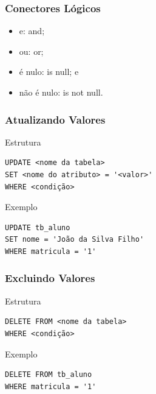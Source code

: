 \documentclass{beamer}
\begin{document}
\begin{frame}
\frametitle{Conectores Lógicos}

\begin{itemize}
	\item e: and;
	\item ou: or;
	\item é nulo: is null; e
	\item não é nulo: is not null.
\end{itemize}
\end{frame}

\begin{frame}[fragile]
\frametitle{Atualizando Valores}

\begin{block}{Estrutura}
\begin{lstlisting}
UPDATE <nome da tabela>
SET <nome do atributo> = '<valor>'
WHERE <condição>
\end{lstlisting}
\end{block}\vfill

\begin{exampleblock}{Exemplo}
\begin{lstlisting}
UPDATE tb_aluno
SET nome = 'João da Silva Filho'
WHERE matricula = '1'
\end{lstlisting}
\end{exampleblock}
\end{frame}

\begin{frame}[fragile]
\frametitle{Excluindo  Valores}

\begin{block}{Estrutura}
\begin{lstlisting}
DELETE FROM <nome da tabela>
WHERE <condição>
\end{lstlisting}
\end{block}\vfill

\begin{exampleblock}{Exemplo}
\begin{lstlisting}
DELETE FROM tb_aluno
WHERE matricula = '1'
\end{lstlisting}
\end{exampleblock}
\end{frame}
\end{document}
